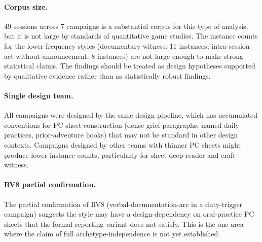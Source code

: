 \paragraph{Corpus size.}
49 sessions across 7 campaigns is a substantial corpus for this type of analysis, but
it is not large by standards of quantitative game studies. The instance counts for
the lower-frequency styles (documentary-witness: 11 instances; intra-session
act-without-announcement: 8 instances) are not large enough to make strong statistical
claims. The findings should be treated as design hypotheses supported by qualitative
evidence rather than as statistically robust findings.

\paragraph{Single design team.}
All campaigns were designed by the same design pipeline, which has accumulated
conventions for PC sheet construction (dense grief paragraphs, named daily practices,
prior-adventure hooks) that may not be standard in other design contexts. Campaigns
designed by other teams with thinner PC sheets might produce lower instance counts,
particularly for sheet-deep-reader and craft-witness.

\paragraph{RV8 partial confirmation.}
The partial confirmation of RV8 (verbal-documentation-arc in a duty-trigger campaign)
suggests the style may have a design-dependency on oral-practice PC sheets that the
formal-reporting variant does not satisfy. This is the one area where the claim of
full archetype-independence is not yet established.
